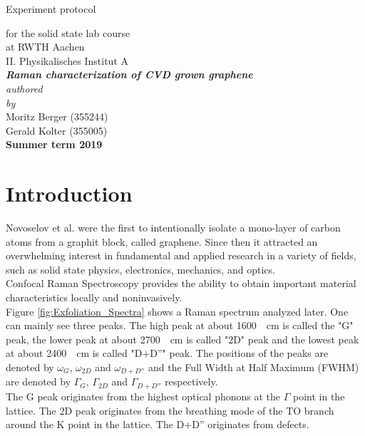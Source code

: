 \documentclass[12pt,a4paper]{article}
\author{Gerald}
\begin{document}
	\setlength{\parindent}{0pt} 
	\begin{center}
		{\LARGE Experiment protocol}\\
		\begin{large}
			for the solid state lab course\\[0.4cm]
			at RWTH Aachen\\
			II. Physikalisches Institut A\\[5.5cm]
			\Large\textbf{\textsl{Raman characterization of CVD grown graphene}}\\[5.5cm]
			\normalsize\textit{authored\\by}\\[0.4cm]
			\large{Moritz Berger (355244)\\Gerald Kolter (355005)}\\[2cm]
			\large \textbf{Summer term 2019}
		\end{large}
	\end{center}
	\newpage
	
	\tableofcontents
	\newpage

\section{Introduction}
Novoselov et al. were the first to intentionally isolate a mono-layer of carbon atoms from a graphit block, called graphene.\cite{Novoselov2004} Since then it attracted an overwhelming interest in fundamental and applied research in a variety of fields, such as solid state physics, electronics, mechanics, and optics.\cite{NeumannStampfer} \\
Confocal Raman Spectroscopy provides the ability to obtain important material characteristics locally and noninvasively.\cite{NeumannStampfer} \\
Figure \ref{fig:Exfoliation_Spectra} shows a Raman spectrum analyzed later. One can mainly see three peaks. The high peak at about \SI{1600}{\per cm} is called the "G" peak, the lower peak at about \SI{2700}{\per cm} is called "2D" peak and the lowest peak at about \SI{2400}{\per cm} is called "D+D''" peak. The positions of the peaks are denoted by $\omega _G$, $\omega _{2D}$ and $\omega _{D+D''}$ and the Full Width at Half Maximum (FWHM) are denoted by $\Gamma _G$, $\Gamma _{2D}$ and $\Gamma _{D+D''}$ respectively. \\
The G peak originates from the highest optical phonons at the $\Gamma$ point in the lattice. The 2D peak originates from the breathing mode of the TO branch around the K point in the lattice. The D+D'' originates from defects\cite{NeumannStampfer}.
\end{document}
